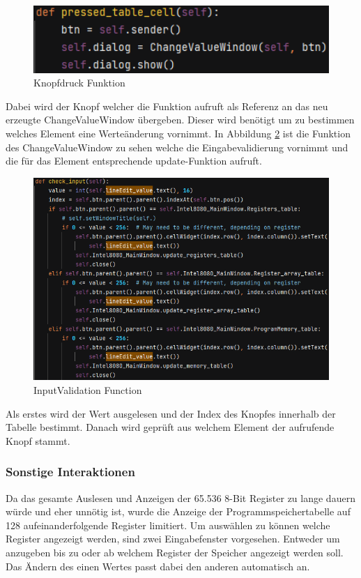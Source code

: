 \documentclass[12pt]{article}
\newcommand{\imgSpaceBefore}{\vspace{10pt}}
\begin{document}
\begin{figure}[H]
\centering
\includegraphics[width=12cm]{bilder/PTC}
\caption{Knopfdruck Funktion}
\label{fig:PTC}
\end{figure}

\noindent
Dabei wird der Knopf welcher die Funktion aufruft als Referenz an das neu erzeugte ChangeValueWindow übergeben. Dieser wird benötigt um zu bestimmen welches Element eine Werteänderung vornimmt. In Abbildung \ref{fig:CheckInput} ist die Funktion des ChangeValueWindow zu sehen welche die Eingabevalidierung vornimmt und die für das Element entsprechende \glqq update\grqq-Funktion aufruft.\imgSpaceBefore

\begin{figure}[H]
\centering
\includegraphics[width=12cm]{bilder/CheckInput}
\caption{InputValidation Function}
\label{fig:CheckInput}
\end{figure}

\noindent
Als erstes wird der Wert ausgelesen und der Index des Knopfes innerhalb der Tabelle bestimmt. Danach wird geprüft aus welchem Element der aufrufende Knopf stammt.

\subsubsection{Sonstige Interaktionen}
Da das gesamte Auslesen und Anzeigen der 65.536 8-Bit Register zu lange dauern würde und eher unnötig ist, wurde die Anzeige der Programmspeichertabelle auf 128 aufeinanderfolgende Register limitiert. Um auswählen zu können welche Register angezeigt werden, sind zwei Eingabefenster vorgesehen. Entweder um anzugeben bis zu oder ab welchem Register der Speicher angezeigt werden soll. Das Ändern des einen Wertes passt dabei den anderen automatisch an.\imgSpaceBefore
\end{document}
